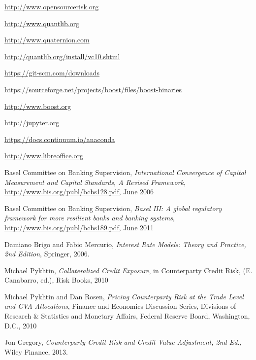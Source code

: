 \documentclass[12pt, a4paper]{article}
\begin{document}
\begin{thebibliography}{*}

 \url{http://www.opensourcerisk.org}

 \url{http://www.quantlib.org}
 
 \url{http://www.quaternion.com}

 \url{http://quantlib.org/install/vc10.shtml}


 \url{https://git-scm.com/downloads}

 \url{https://sourceforge.net/projects/boost/files/boost-binaries}

 \url{http://www.boost.org}

 \url{http://jupyter.org}

 \url{https://docs.continuum.io/anaconda}

 \url{http://www.libreoffice.org}


 Basel Committee on Banking Supervision, {\em International Convergence of Capital Measurement and
    Capital Standards, A Revised Framework}, \url{http://www.bis.org/publ/bcbs128.pdf}, June 2006

 Basel Committee on Banking Supervision, {\em Basel III: A global regulatory framework for more
    resilient banks and banking systems}, \url{http://www.bis.org/publ/bcbs189.pdf}, June 2011

 Damiano Brigo and Fabio Mercurio, {\em Interest Rate Models: Theory and Practice, 2nd Edition},
  Springer, 2006.

 Michael Pykhtin, {\em Collateralized Credit Exposure}, in Counterparty Credit Risk, (E. Canabarro,
  ed.), Risk Books, 2010

 Michael Pykhtin and Dan Rosen, {\em Pricing Counterparty Risk at the Trade Level and CVA
    Allocations}, Finance and Economics Discussion Series, Divisions of Research \& Statistics and Monetary Affairs,
  Federal Reserve Board, Washington, D.C., 2010

 Jon Gregory, {\em Counterparty Credit Risk and Credit Value Adjustment, 2nd Ed.}, Wiley Finance,
  2013.


\end{thebibliography}
\end{document}
